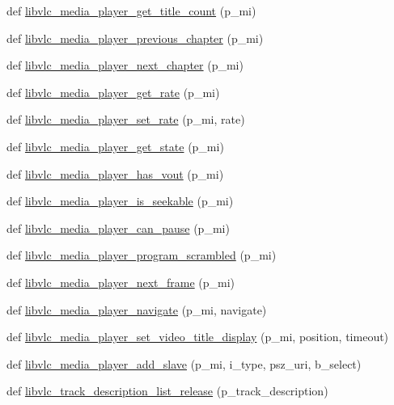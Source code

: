\begin{DoxyCompactItemize}
def \hyperlink{namespacevlc_a928f5b0cc17b98170b0a0bf9b045a504}{libvlc\+\_\+media\+\_\+player\+\_\+get\+\_\+title\+\_\+count} (p\+\_\+mi)
\item 
def \hyperlink{namespacevlc_abec40b98a43df9c42c55c24dbfb08b67}{libvlc\+\_\+media\+\_\+player\+\_\+previous\+\_\+chapter} (p\+\_\+mi)
\item 
def \hyperlink{namespacevlc_a3aeeb47d986476bf88849c78532bf066}{libvlc\+\_\+media\+\_\+player\+\_\+next\+\_\+chapter} (p\+\_\+mi)
\item 
def \hyperlink{namespacevlc_a3630bafb220ea8c988c4d7c7e4a9f0a6}{libvlc\+\_\+media\+\_\+player\+\_\+get\+\_\+rate} (p\+\_\+mi)
\item 
def \hyperlink{namespacevlc_a2b9fb9b6a7652775b6ae4b4cb0782854}{libvlc\+\_\+media\+\_\+player\+\_\+set\+\_\+rate} (p\+\_\+mi, rate)
\item 
def \hyperlink{namespacevlc_a60436fe75d714191a7df72db2c83e8b9}{libvlc\+\_\+media\+\_\+player\+\_\+get\+\_\+state} (p\+\_\+mi)
\item 
def \hyperlink{namespacevlc_aa73c70b2cb89d51766a528e4ba329f06}{libvlc\+\_\+media\+\_\+player\+\_\+has\+\_\+vout} (p\+\_\+mi)
\item 
def \hyperlink{namespacevlc_a0dfac2d253dd73294fbc61a21a0dab61}{libvlc\+\_\+media\+\_\+player\+\_\+is\+\_\+seekable} (p\+\_\+mi)
\item 
def \hyperlink{namespacevlc_a175c3b4575fc50df873cc8efaa052522}{libvlc\+\_\+media\+\_\+player\+\_\+can\+\_\+pause} (p\+\_\+mi)
\item 
def \hyperlink{namespacevlc_a17e9b0dc6a8244a4c018d79adb86095a}{libvlc\+\_\+media\+\_\+player\+\_\+program\+\_\+scrambled} (p\+\_\+mi)
\item 
def \hyperlink{namespacevlc_a421aba27bf34a6bc342d3d0a019efb64}{libvlc\+\_\+media\+\_\+player\+\_\+next\+\_\+frame} (p\+\_\+mi)
\item 
def \hyperlink{namespacevlc_a1fea7d3530a5c500357969307e5bea7e}{libvlc\+\_\+media\+\_\+player\+\_\+navigate} (p\+\_\+mi, navigate)
\item 
def \hyperlink{namespacevlc_a9dd5dd28c47ef1630ebf1c9da682eed2}{libvlc\+\_\+media\+\_\+player\+\_\+set\+\_\+video\+\_\+title\+\_\+display} (p\+\_\+mi, position, timeout)
\item 
def \hyperlink{namespacevlc_a1b31a681e5dab5d45ec9c0ed1badd839}{libvlc\+\_\+media\+\_\+player\+\_\+add\+\_\+slave} (p\+\_\+mi, i\+\_\+type, psz\+\_\+uri, b\+\_\+select)
\item 
def \hyperlink{namespacevlc_a15a83a58b01dc7546ad799fffe743a93}{libvlc\+\_\+track\+\_\+description\+\_\+list\+\_\+release} (p\+\_\+track\+\_\+description)

\end{DoxyCompactItemize}
